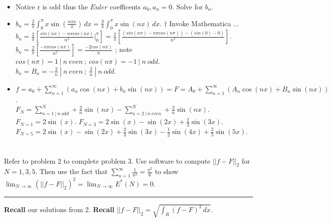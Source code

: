 \documentclass[10pt]{article}
\begin{document}
\begin{itemize}
    \item Notice r is odd thus the $ Euler $ coefficents $ a_0, a_n = 0 $. Solve for $ b_n $. \\
    \item $ \displaystyle b_n = \frac{2}{\pi}  \int_{0}^{\pi}  x \sin(\frac{n\pi x}{\pi}) \,dx = \frac{2}{\pi}  \int_{0}^{\pi} x \sin(nx) \,dx $. $ \dagger $ Invoke Mathematica $ \dots $ \\
    \subitem $ \displaystyle b_n = \frac{2}{\pi} [\frac{sin(nx) - nx cos(nx)}{n^2} \Big|_{0}^{\pi}] = \frac{2}{\pi} [\frac{(sin(n \pi) - n \pi cos(n \pi)) - (sin(0) - 0)}{n^2}] $.
    \subitem $ \displaystyle b_n = \frac{2}{\pi} [\frac{- n \pi cos(n \pi)}{n^2}]  = \frac{- 2 cos(n \pi)}{n} $ ; note $ cos(n\pi) = 1 \ | \ n \ even \ ; \ cos(n\pi) = -1 \ | \ n \ odd $.
    \subitem $ \displaystyle b_n = B_n = -\frac{2}{n} \ | \ n \ even \ ; \ \frac{2}{n} \ | \ n \ odd $.
    \item $ \displaystyle f = a_0 + \sum_{n = 1}^{\infty} (a_n \cos(nx) + b_n \sin (nx)) = F = A_0 + \sum_{n = 1}^{\infty} (A_n\cos(nx) + B_n\sin(nx)) $. \\
    \subitem $ \displaystyle F_N = \sum_{n = 1 \ | \ n \ odd}^N + \frac{2}{n} \sin(nx) - \sum_{n = 2 \ | \ n \ even}^N + \frac{2}{n} \sin(nx) $.
    \subitem $ \displaystyle F_{N = 1} = 2 \sin(x) $.
    \subitem $ \displaystyle F_{N = 3} = 2 \sin(x) - \sin(2x) + \frac{2}{3} \sin(3x) $.
    \subitem $ \displaystyle F_{N = 5} = 2 \sin(x) - \sin(2x) + \frac{2}{3} \sin(3x) - \frac{1}{2} \sin(4x) + \frac{2}{5} \sin(5x) $.    
\end{itemize} 


\newpage


\section{\underline{}}
\label{sec: Problem 3}
\noindent
Refer to problem 2 to complete problem 3. Use software to compute $ ||f-F||_2 $ for $ N = 1, 3, 5 $. Then use the fact that $ \displaystyle \sum_{n = 1}^\infty \frac{1}{n^2} = \frac{\pi^2}{6} $ to show $ \displaystyle \lim_{N\to\infty}(||f-F||_2)^2 = \lim_{N\to\infty}E^*(N) = 0 $. \\
\vspace{2.5mm}
\hrule

\vspace{7.5mm}

\noindent
\textbf{Recall} our solutions from 2. \textbf{Recall} $ \displaystyle ||f-F||_2 = \sqrt{\int_{R} (f - F)^2 \,dx} $. \\
\end{document}
